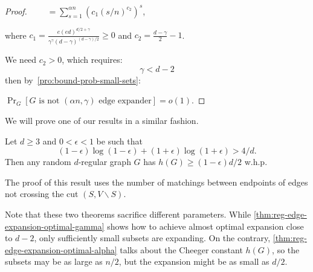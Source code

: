 \begin{proof}
    $\qquad=\sum_{s=1}^{\alpha n}{\left(c_1\left(s/n\right)^{c_2}\right)^s}$,
    
    where $c_1=\frac{e(ed)^{d/2+\gamma}}{\gamma^\gamma(d-\gamma)^{(d-\gamma)/2}}\geq 0$
    and $c_2=\frac{d-\gamma}{2}-1$.
    
    We need $c_2>0$, which requires:
    \begin{equation}
        \gamma<d-2
    \end{equation}
    then by~\autoref{pro:bound-prob-small-sets}:
    
    $\Pr_G[G\text{ is not }(\alpha n,\gamma)\text{ edge expander}]=o(1)$.
\end{proof}

We will prove one of our results in a similar fashion.

\begin{theorem}
    \label{thm:reg-edge-expansion-optimal-alpha}
    Let $d\geq3$ and $0<\epsilon<1$ be such that
    \begin{equation}
        \label{eq:bol-eps-req}
        (1-\epsilon)\log{(1-\epsilon)}+(1+\epsilon)\log{(1+\epsilon)}>4/d.
    \end{equation}
    Then any random $d$-regular graph $G$ has $h(G)\geq(1-\epsilon)d/2$ w.h.p.
\end{theorem}

The proof of this result uses the number of matchings
between endpoints of edges not crossing the cut $(S,V\backslash S)$.

Note that these two theorems sacrifice different parameters.
While \autoref{thm:reg-edge-expansion-optimal-gamma} shows how to achieve almost optimal expansion close to $d-2$,
only sufficiently small subsets are expanding.
On the contrary, \autoref{thm:reg-edge-expansion-optimal-alpha} talks about the Cheeger constant $h(G)$,
so the subsets may be as large as $n/2$, but the expansion might be as small as $d/2$.

